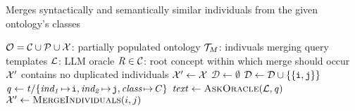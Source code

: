 \begin{algorithm}
    \captionsetup{font=\algCaptionSize}
    \caption{Merges syntactically and semantically similar individuals from the given ontology's classes}
    \label{alg:merge}
    \begin{algorithmic}[1]\algCodeSize
        \Require $\relset{O} = \relset{C} \cup \relset{P} \cup \relset{X}$: partially populated ontology
        \Require $\relset{T}_{M}$: indivuals merging query templates
        \Require $\relset{L}$: LLM oracle
        \Require $\concept{R} \in \relset{C}$: root concept within which merge should occur
        \Ensure $\relset{X}'$ contains no duplicated individuals
        \medskip
            \State $\relset{X}' \gets \relset{X}$
                \State $\mathcal{D} \gets \emptyset$
                        \State $\mathcal{D} \gets \mathcal{D} \cup \{\{\instance{i}, \instance{j}\}\}$
                    \EndIf
                \EndFor
                    \label{line:next-couple}
                        \State $\mathit{q} \gets \mathit{t}/\{ \var{ind_1}\!\mapsto\!\instance{i}, \var{ind_2}\!\mapsto\!\instance{j},
                            \var{class}\!\mapsto\!\concept{C} \}$
                        \State $\mathit{text} \gets \Call{\askOracle}{\relset{L}, \mathit{q}}$
                            \State $\relset{X}' \gets \Call{\mergeInst}{i, j}$
                            \State {}
                        \EndIf
                    \EndFor
                \EndFor
            \EndFor
        \EndFunction
    \end{algorithmic}
\end{algorithm}
